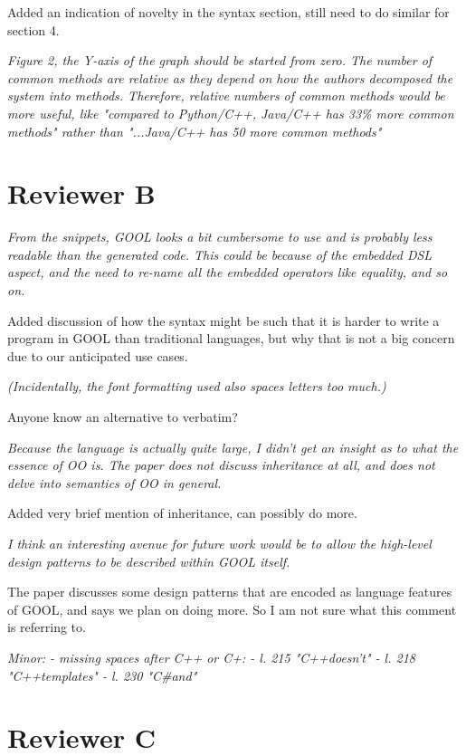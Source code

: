 \documentclass[12pt]{article}
\begin{document}
Added an indication of novelty in the syntax section, still need to do similar 
for section 4.

\textit{Figure 2, the Y-axis of the graph should be started from zero.  The 
number of common methods are relative as they depend on how the authors 
decomposed the system into methods.  Therefore, relative numbers of common 
methods would be more useful, like "compared to Python/C++, Java/C++ has 33\% 
more common methods" rather  than "...Java/C++ has 50 more common methods"}

\section{Reviewer B}

\textit{From the snippets, GOOL looks a bit cumbersome to use and is probably 
less readable than the generated code. This could be because of the embedded 
DSL aspect, and the need to re-name all the embedded operators like equality, 
and so on.}

Added discussion of how the syntax might be such that it is harder to write a 
program in GOOL than traditional languages, but why that is not a big concern 
due to our anticipated use cases.

\textit{(Incidentally, the font formatting used also spaces letters too much.)}

Anyone know an alternative to verbatim?

\textit{Because the language is actually quite large, I didn't get an insight 
as to what the essence of OO is. The paper does not discuss inheritance at all, 
and does not delve into semantics of OO in general.}

Added very brief mention of inheritance, can possibly do more.

\textit{I think an interesting avenue for future work would be to allow the 
high-level design patterns to be described within GOOL itself.}

The paper discusses some design patterns that are encoded as language features 
of GOOL, and says we plan on doing more. So I am not sure what this comment is 
referring to.

\textit{Minor:
	- missing spaces after C++ or C+:
	- l. 215 "C++doesn’t"
	- l. 218 "C++templates"
	- l. 230 "C\#and"}

\section{Reviewer C}
\end{document}
